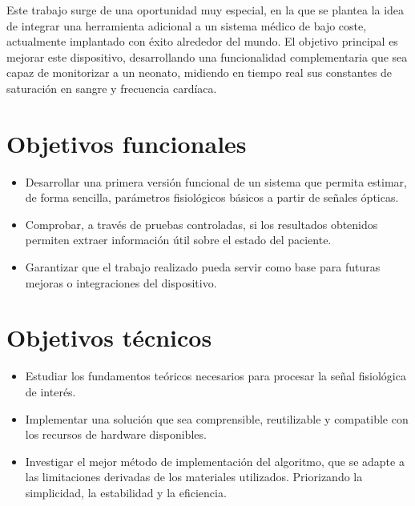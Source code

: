 
Este trabajo surge de una oportunidad muy especial, en la que se plantea la idea de integrar una herramienta adicional a un sistema médico de bajo coste, actualmente implantado con éxito alrededor del mundo. El objetivo principal es mejorar este dispositivo, desarrollando una funcionalidad complementaria que sea capaz de monitorizar a un neonato, midiendo en tiempo real sus constantes de saturación en sangre y frecuencia cardíaca. 


\section{Objetivos funcionales}
\begin{itemize}
    \item Desarrollar una primera versión funcional de un sistema que permita estimar, de forma sencilla, parámetros fisiológicos básicos a partir de señales ópticas.
    \item Comprobar, a través de pruebas controladas, si los resultados obtenidos permiten extraer información útil sobre el estado del paciente.
    \item  Garantizar que el trabajo realizado pueda servir como base para futuras mejoras o integraciones del dispositivo.
\end{itemize}

\section{Objetivos técnicos}
    \begin{itemize}
        \item Estudiar los fundamentos teóricos necesarios para procesar la señal fisiológica de interés.
        \item Implementar una solución que sea comprensible, reutilizable y compatible con los recursos de hardware disponibles.
        \item Investigar el mejor método de implementación del algoritmo, que se adapte a las limitaciones derivadas de los materiales utilizados. Priorizando la simplicidad, la estabilidad y la eficiencia.
    \end{itemize}

